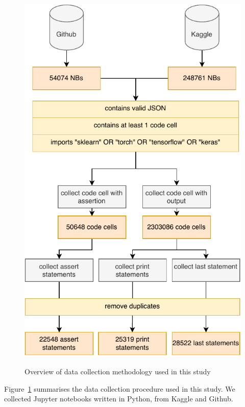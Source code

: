 
\begin{figure}
  \centering
  \includegraphics[width=0.75\linewidth]{data-collection.pdf}
  \label{fig:data-collection}
  \caption{Overview of data collection methodology used in this study}
\end{figure}

Figure~\ref{fig:data-collection} summarises the data collection procedure used in this study. We collected Jupyter notebooks written in Python, from Kaggle and Github. 

